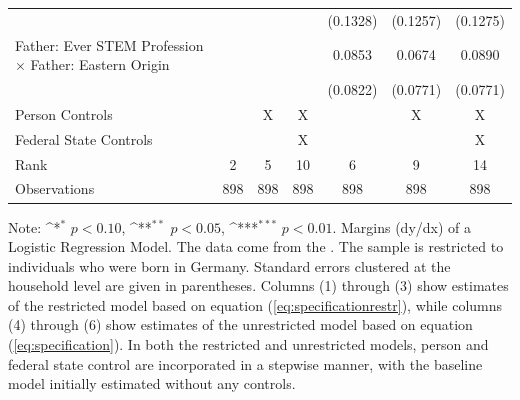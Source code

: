 \documentclass[a4paper, oneside, hyperfootnotes = false]{article}
\def\sym#1{\ifmmode^{#1}\else\(^{#1}\)\fi}
\begin{document}
{\begin{landscape}
\begin{table}[ht]
\begin{center}
{\begin{tabular}{l*{6}{c}}
					&                     &                     &                     &    (0.1328)         &    (0.1257)         &    (0.1275)         \\
					\addlinespace
					Father: Ever STEM Profession $\times$ Father: Eastern Origin&                     &                     &                     &      0.0853         &      0.0674         &      0.0890         \\
					&                     &                     &                     &    (0.0822)         &    (0.0771)         &    (0.0771)         \\
					\midrule
					Person Controls & & X  & X & & X & X \\
					Federal State Controls & & & X & & & X \\
					Rank                &      2         &      5         &     10         &      6         &      9         &     14         \\
					Observations   &    898         &    898         &    898         &    898         &    898         &    898         \\
					\bottomrule
			\end{tabular}}
			
			\vspace{2mm}
			
			\parbox{15cm}{
				\linespread{1}\footnotesize Note: \sym{*} \(p<0.10\), \sym{**} \(p<0.05\), \sym{***} \(p<0.01\). Margins (dy/dx) of a Logistic Regression Model. The data come from the \cite{SOEP2023}. The sample is restricted to individuals who were born in Germany. Standard errors clustered at the household level are given in parentheses. Columns (1) through (3) show estimates of the restricted model based on equation (\ref{eq:specificationrestr}), while columns (4) through (6) show estimates of the unrestricted model based on equation (\ref{eq:specification}). In both the restricted and unrestricted models, person and federal state control are incorporated in a stepwise manner, with the baseline model initially estimated without any controls.}
			
		\end{center}
	\end{table}
\end{landscape}

}
\end{document}
